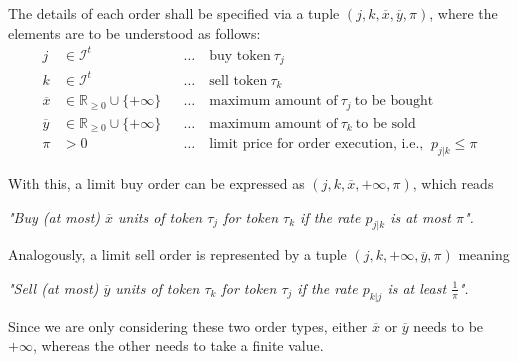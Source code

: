 \documentclass[11pt,parskip=full]{scrartcl}%
\newcommand*{\ie}{i.e., }
\newcommand*{\itokens}{\mathcal{I}^t}       %
\begin{document}
The details of each order shall be specified via a tuple $ (j,k,\overline{x},\overline{y},\pi) $,
where the elements are to be understood as follows:
\begin{align*}
  j &\in \itokens &&
    \ldots \quad \text{buy token} \> \tau_j\\
  k &\in \itokens &&
    \ldots \quad \text{sell token} \> \tau_k\\
  \overline{x} &\in \mathbb{R}_{\ge 0} \cup \{+\infty\} &&
    \ldots \quad \text{maximum amount of} \> \tau_j \> \text{to be bought}\\
  \overline{y} &\in \mathbb{R}_{\ge 0} \cup \{+\infty\} &&
    \ldots \quad \text{maximum amount of} \> \tau_k \> \text{to be sold}\\
  \pi &> 0 &&
    \ldots \quad \text{limit price for order execution, \ie} \> p_{j|k} \le \pi
\end{align*}

\vspace{-.3cm}
With this, a limit buy order can be expressed as $ (j,k,\overline{x},+\infty,\pi) $,
which reads
\vspace{-.6cm}
\begin{center}
  \emph{
    "Buy (at most) $ \overline{x} $ units of token $ \tau_j $ for token $ \tau_k $
    if the rate $ p_{j|k} $ is at most $ \pi $".
  }
\end{center}

\vspace{-.4cm}
Analogously, a limit sell order is represented by a tuple $ (j,k,+\infty,\overline{y},\pi) $
meaning
\vspace{-.6cm}
\begin{center}
  \emph{
    "Sell (at most) $ \overline{y} $ units of token $ \tau_k $ for token $ \tau_j $
    if the rate $ p_{k|j} $ is at least $ \frac{1}{\pi} $".
  }
\end{center}
\vspace{-.3cm}

Since we are only considering these two order types, either $ \overline{x} $ or $ \overline{y} $
needs to be $ +\infty $, whereas the other needs to take a finite value.
\end{document}
